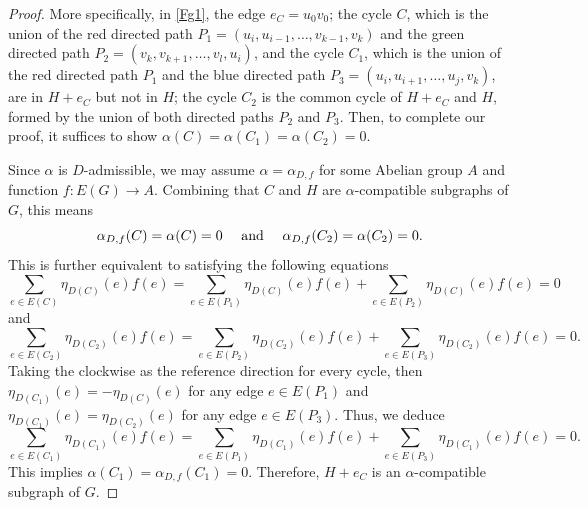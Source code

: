 \documentclass[10pt,a4paper]{amsart}
\def\And{\mbox{\rm ~and~}}
\begin{document}
\begin{proof}
More specifically, in \autoref{Fg1},  the edge $e_C=u_0v_0$; the cycle $C$, which is the union of the red directed path $P_1=(u_i,u_{i-1},\ldots,v_{k-1},v_k)$ and the green directed path $P_2=(v_k,v_{k+1},\ldots,v_l,u_i)$, and the cycle $C_1$, which is the union of  the red directed path $P_1$ and the blue directed path $P_3=(u_i,u_{i+1},\ldots,u_j,v_k)$, are in $H+e_C$ but not in $H$; the cycle $C_2$ is the common cycle of $H+e_C$ and $H$, formed by the union of both directed paths $P_2$ and $P_3$. Then, to complete our proof, it suffices to show $\alpha(C)=\alpha(C_1)=\alpha(C_2)=0$.

Since $\alpha$ is $D$-admissible, we may assume $\alpha=\alpha_{D,f}$ for some Abelian group $A$ and function $f:E(G)\to A$. Combining that $C$ and $H$ are $\alpha$-compatible subgraphs of $G$, this means 
\[
\alpha_{D,f}(C)=\alpha(C)=0\quad\And\quad\alpha_{D,f}(C_2)=\alpha(C_2)=0.
\]
This is further equivalent to satisfying the following equations
\[
\sum_{e\in E(C)}\eta_{D(C)}(e)f(e)=\sum_{e\in E(P_1)}\eta_{D(C)}(e)f(e)+\sum_{e\in E(P_2)}\eta_{D(C)}(e)f(e)=0
\]
and
\[
\sum_{e\in E(C_2)}\eta_{D(C_2)}(e)f(e)=\sum_{e\in E(P_2)}\eta_{D(C_2)}(e)f(e)+\sum_{e\in E(P_3)}\eta_{D(C_2)}(e)f(e)=0.
\]
Taking the clockwise as the reference direction for every cycle, then $\eta_{D(C_1)}(e)=-\eta_{D(C)}(e)$ for any edge $e\in E(P_1)$ and $\eta_{D(C_1)}(e)=\eta_{D(C_2)}(e)$ for any edge $e\in E(P_3)$. Thus, we deduce
\[
\sum_{e\in E(C_1)}\eta_{D(C_1)}(e)f(e)=\sum_{e\in E(P_1)}\eta_{D(C_1)}(e)f(e)+\sum_{e\in E(P_3)}\eta_{D(C_1)}(e)f(e)=0.
\]
This implies $\alpha(C_1)=\alpha_{D,f}(C_1)=0$. Therefore, $H+e_C$ is an $\alpha$-compatible subgraph of $G$.
\end{proof}
\end{document}
